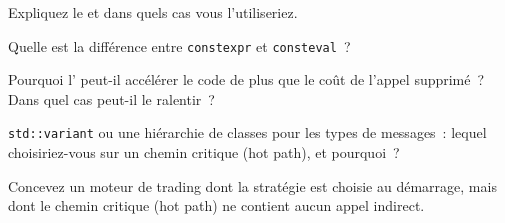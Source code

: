 \begin{interviewq}\label{iq:ll:cpp-for-latency-ii-compile-time:2}
Expliquez le  et dans quels cas vous l'utiliseriez.
\end{interviewq}

\begin{interviewq}\label{iq:ll:cpp-for-latency-ii-compile-time:3}
Quelle est la différence entre \texttt{constexpr} et \texttt{consteval}~?
\end{interviewq}

\begin{interviewq}\label{iq:ll:cpp-for-latency-ii-compile-time:4}
Pourquoi l' peut-il accélérer le code de plus que le coût de l'appel supprimé~? Dans quel cas peut-il le ralentir~?
\end{interviewq}

\begin{interviewq}\label{iq:ll:cpp-for-latency-ii-compile-time:5}
\texttt{std::variant} ou une hiérarchie de classes pour les types de messages~: lequel choisiriez-vous sur un chemin critique (hot path), et pourquoi~?
\end{interviewq}

\begin{interviewq}\label{iq:ll:cpp-for-latency-ii-compile-time:6}
Concevez un moteur de trading dont la stratégie est choisie au démarrage, mais dont le chemin critique (hot path) ne contient aucun appel indirect.
\end{interviewq}
